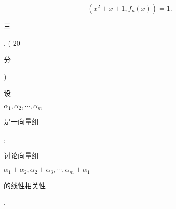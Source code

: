 \documentclass[10pt]{article}
\begin{document}
$$
\left(x^{2}+x+1, f_{n}(x)\right)=1 .
$$
\begin{CJK}{UTF8}{mj}三\end{CJK}. ( 20 \begin{CJK}{UTF8}{mj}分\end{CJK}) \begin{CJK}{UTF8}{mj}设\end{CJK} $\alpha_{1}, \alpha_{2}, \cdots, \alpha_{m}$ \begin{CJK}{UTF8}{mj}是一向量组\end{CJK}, \begin{CJK}{UTF8}{mj}讨论向量组\end{CJK} $\alpha_{1}+\alpha_{2}, \alpha_{2}+\alpha_{3}, \cdots, \alpha_{m}+\alpha_{1}$ \begin{CJK}{UTF8}{mj}的线性相关性\end{CJK}.
\end{document}
